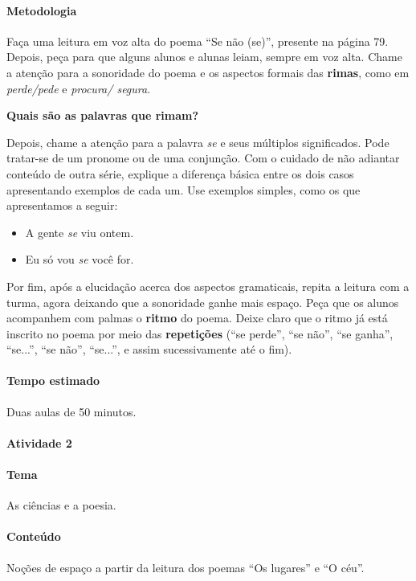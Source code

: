 \documentclass[11pt]{extarticle}
\begin{document}
\paragraph{Metodologia} Faça uma leitura em voz alta do poema 
``Se não (se)'', presente na página 79. 
Depois, peça para que alguns alunos e alunas leiam, 
sempre em voz alta.
Chame a atenção para a sonoridade do poema e os aspectos formais
das \textbf{rimas}, como em \textit{perde/pede} e \textit{procura/ segura}.

\textbf{Quais são as palavras que rimam?}


Depois, chame a atenção para a palavra \textit{se} e seus múltiplos significados.
Pode tratar-se de um pronome ou de uma conjunção. 
Com o cuidado de não adiantar conteúdo de outra série,
explique a diferença básica entre os dois casos 
apresentando exemplos de cada um. Use exemplos simples, como os que apresentamos a seguir:

\begin{itemize}
	\item A gente \textit{se} viu ontem.
	\item Eu só vou \textit{se} você for.
\end{itemize}

Por fim, após a elucidação acerca dos aspectos gramaticais,
repita a leitura com a turma, agora deixando que a 
sonoridade ganhe mais espaço.
Peça que os alunos acompanhem com palmas o \textbf{ritmo} do poema. 
Deixe claro que o ritmo já está inscrito no poema por meio das 
\textbf{repetições} (``se perde'', ``se não'', ``se ganha'', ``se...'', ``se não'', ``se...'', 
e assim sucessivamente até o fim).


\paragraph{Tempo estimado} Duas aulas de 50 minutos.

\paragraph{Atividade 2}

\paragraph{Tema} As ciências e a poesia. 

\paragraph{Conteúdo} Noções de espaço a partir da leitura dos poemas ``Os lugares'' e ``O céu''.
\end{document}
